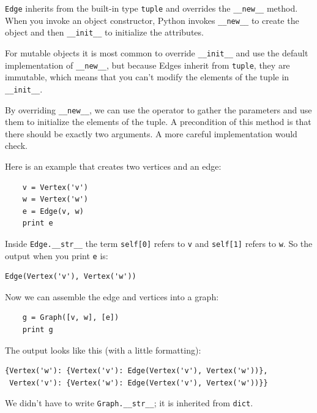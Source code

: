 \documentclass[10pt]{book}
\begin{document}
{\tt Edge} inherits from the built-in type {\tt tuple}
and overrides the \verb"__new__" method.  When you invoke
an object constructor, Python invokes \verb"__new__" to create
the object and then \verb"__init__" to initialize the attributes.

For mutable objects it is most common to override
\verb"__init__" and use the default implementation of
\verb"__new__", but because Edges inherit from {\tt tuple}, they
are immutable, which means that you can't modify the elements
of the tuple in \verb"__init__".

By overriding \verb"__new__", we can use the {\tt *} operator to
gather the parameters and use them to initialize the elements of
the tuple.  A precondition of this method is that there should
be exactly two arguments.  A more careful implementation would
check.

Here is an example that creates two vertices and an edge:

\begin{verbatim}
    v = Vertex('v')
    w = Vertex('w')
    e = Edge(v, w)
    print e
\end{verbatim}

Inside \verb"Edge.__str__" the term {\tt self[0]} refers  
to {\tt v} and {\tt self[1]} refers to {\tt w}.  So the output
when you print {\tt e} is:

\begin{verbatim}
Edge(Vertex('v'), Vertex('w'))
\end{verbatim}

Now we can assemble the edge and vertices into a graph:

\begin{verbatim}
    g = Graph([v, w], [e])
    print g
\end{verbatim}

The output looks like this (with a little formatting):

\begin{verbatim}
{Vertex('w'): {Vertex('v'): Edge(Vertex('v'), Vertex('w'))},
 Vertex('v'): {Vertex('w'): Edge(Vertex('v'), Vertex('w'))}}
\end{verbatim}

We didn't have to write \verb"Graph.__str__"; it is inherited
from {\tt dict}.
\end{document}
